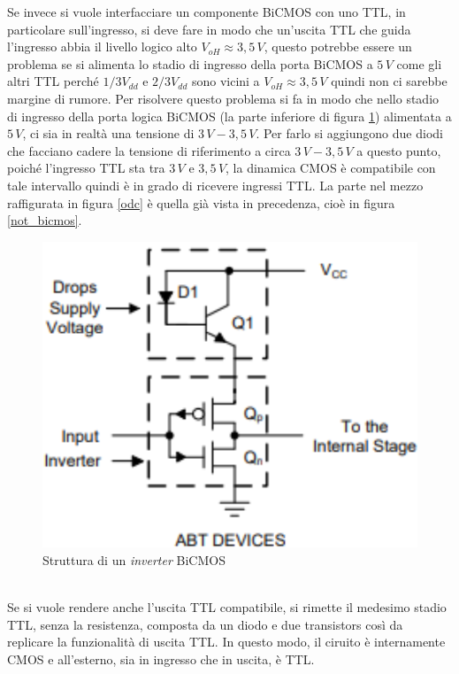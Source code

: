 \documentclass[12pt, a4paper]{report}
\begin{document}
Se invece si vuole interfacciare un componente BiCMOS con uno TTL, in particolare sull'ingresso, si deve fare in modo che un'uscita TTL che guida l'ingresso abbia il livello logico alto $V_{oH} \approx 3,5\,V$, questo potrebbe essere un problema se si alimenta lo stadio di ingresso della porta BiCMOS a $5\,V$ come gli altri TTL perché $1/3V_{dd}$ e $2/3V_{dd}$ sono vicini a $V_{oH} \approx 3,5\,V$ quindi non ci sarebbe margine di rumore. Per risolvere questo problema si fa in modo che nello stadio di ingresso della porta logica BiCMOS (la parte inferiore di figura \ref{bicmos}) alimentata a $5\,V$, ci sia in realtà una tensione di $3\,V - 3,5\,V$. Per farlo si aggiungono due diodi che facciano cadere la tensione di riferimento a circa $3\,V - 3,5\,V$ a questo punto, poiché l'ingresso TTL sta tra $3\,V$ e $3,5\,V$, la dinamica CMOS è compatibile con tale intervallo quindi è in grado di ricevere ingressi TTL. La parte nel mezzo raffigurata in figura \ref{odc} è quella già vista in precedenza, cioè in figura \ref{not_bicmos}.
\begin{figure}[h]
    \centering
    \includegraphics[scale=0.4,angle=0]{bicmos2.png}
    \caption{Struttura di un \textit{inverter} BiCMOS}
    \label{bicmos}
\end{figure}
\\Se si vuole rendere anche l'uscita TTL compatibile, si rimette il medesimo stadio TTL, senza la resistenza, composta da un diodo e due transistors così da replicare la funzionalità di uscita TTL. In questo modo, il ciruito è internamente CMOS e all'esterno, sia in ingresso che in uscita, è TTL.
\end{document}
